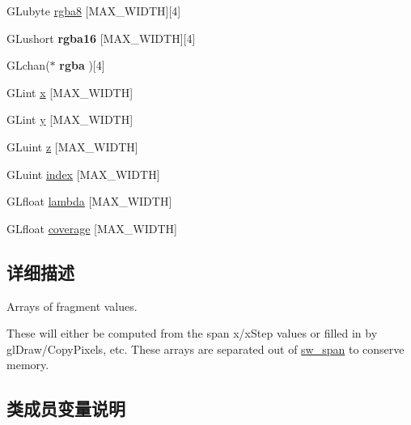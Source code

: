 \begin{DoxyCompactItemize}
\item 
G\+Lubyte \hyperlink{structsw__span__arrays_ab9f9edd7c0e0b191d1d1df8516ea5962}{rgba8} \mbox{[}M\+A\+X\+\_\+\+W\+I\+D\+TH\mbox{]}\mbox{[}4\mbox{]}
\item 
\mbox{\label{structsw__span__arrays_a1a203ab1d13c297b06a46997a9df3300}} 
G\+Lushort {\bfseries rgba16} \mbox{[}M\+A\+X\+\_\+\+W\+I\+D\+TH\mbox{]}\mbox{[}4\mbox{]}
\item 
\mbox{\label{structsw__span__arrays_ac2c10a591d97a0b33fc3fdd55ee45d7a}} 
G\+Lchan($\ast$ {\bfseries rgba} )\mbox{[}4\mbox{]}
\item 
G\+Lint \hyperlink{structsw__span__arrays_a6b21cd8ca196acbb454b3967f4a0b92a}{x} \mbox{[}M\+A\+X\+\_\+\+W\+I\+D\+TH\mbox{]}
\item 
G\+Lint \hyperlink{structsw__span__arrays_ae4259320c4c6c02e150707c0c041951d}{y} \mbox{[}M\+A\+X\+\_\+\+W\+I\+D\+TH\mbox{]}
\item 
G\+Luint \hyperlink{structsw__span__arrays_a54524d3ba7c31144ac8e9044617a93c7}{z} \mbox{[}M\+A\+X\+\_\+\+W\+I\+D\+TH\mbox{]}
\item 
G\+Luint \hyperlink{structsw__span__arrays_a8688a5afa769567c30c314a7c512c82c}{index} \mbox{[}M\+A\+X\+\_\+\+W\+I\+D\+TH\mbox{]}
\item 
G\+Lfloat \hyperlink{structsw__span__arrays_ae72e06513f4cd192a3a7f3673a74c7e2}{lambda} \mbox{[}M\+A\+X\+\_\+\+W\+I\+D\+TH\mbox{]}
\item 
G\+Lfloat \hyperlink{structsw__span__arrays_a3d1c21357d67eacc0078bcd273f8729b}{coverage} \mbox{[}M\+A\+X\+\_\+\+W\+I\+D\+TH\mbox{]}
\end{DoxyCompactItemize}



\subsection{详细描述}
Arrays of fragment values. 

These will either be computed from the span x/x\+Step values or filled in by gl\+Draw/\+Copy\+Pixels, etc. These arrays are separated out of \hyperlink{structsw__span}{sw\+\_\+span} to conserve memory. 

\subsection{类成员变量说明}
\mbox{\label{structsw__span__arrays_a84299c89dce42d427519abbf8257b944}} 
